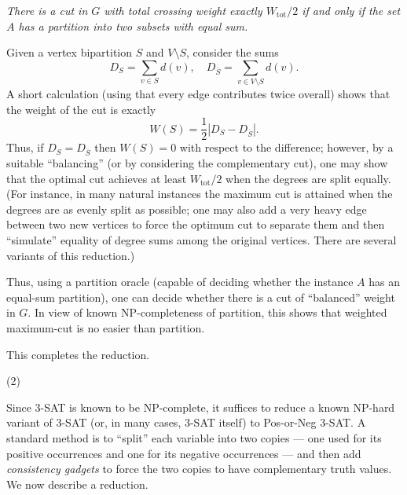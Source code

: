 \documentclass[letterpaper, 11pt]{article}
\newcommand{\1}{\mathds{1}}	%
\theoremstyle{definition}
\newenvironment{solution}{{\par\noindent\it Solution.}}{}
\begin{document}
\begin{solution}
\medskip
{} \emph{There is a cut in \(G\) with total crossing weight exactly \(W_{\text{tot}}/2\) if and only if the set \(A\) has a partition into two subsets with equal sum.}

\medskip
{}  
Given a vertex bipartition \(S\) and \(V\setminus S\), consider the sums 
\[
D_S = \sum_{v\in S} d(v),\quad D_{\overline{S}} = \sum_{v\in V\setminus S} d(v).
\]
A short calculation (using that every edge contributes twice overall) shows that the weight of the cut is exactly
\[
W(S) = \frac{1}{2}\left| D_S - D_{\overline{S}}\right|.
\]
Thus, if \(D_S = D_{\overline{S}}\) then \(W(S)=0\) with respect to the difference; however, by a suitable “balancing” (or by considering the complementary cut), one may show that the optimal cut achieves at least \(W_{\text{tot}}/2\) when the degrees are split equally. (For instance, in many natural instances the maximum cut is attained when the degrees are as evenly split as possible; one may also add a very heavy edge between two new vertices to force the optimum cut to separate them and then “simulate” equality of degree sums among the original vertices. There are several variants of this reduction.) 

Thus, using a partition oracle (capable of deciding whether the instance \(A\) has an equal-sum partition), one can decide whether there is a cut of “balanced” weight in \(G\). In view of known NP-completeness of partition, this shows that weighted maximum-cut is no easier than partition.

\medskip
This completes the reduction.

\bigskip
(2)

Since 3-SAT is known to be NP-complete, it suffices to reduce a known NP-hard variant of 3-SAT (or, in many cases, 3-SAT itself) to Pos-or-Neg 3-SAT. A standard method is to “split” each variable into two copies --- one used for its positive occurrences and one for its negative occurrences --- and then add \emph{consistency gadgets} to force the two copies to have complementary truth values. We now describe a reduction.


\end{solution}
\end{document}
